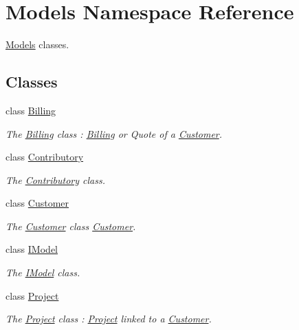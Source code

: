 \hypertarget{namespaceModels}{\section{Models Namespace Reference}
\label{namespaceModels}
}


\hyperlink{namespaceModels}{Models} classes.  


\subsection*{Classes}
\begin{DoxyCompactItemize}
\item 
class \hyperlink{classModels_1_1Billing}{Billing}
\begin{DoxyCompactList}\small\item\em The \hyperlink{classModels_1_1Billing}{Billing} class \-: \hyperlink{classModels_1_1Billing}{Billing} or Quote of a \hyperlink{classModels_1_1Customer}{Customer}. \end{DoxyCompactList}\item 
class \hyperlink{classModels_1_1Contributory}{Contributory}
\begin{DoxyCompactList}\small\item\em The \hyperlink{classModels_1_1Contributory}{Contributory} class. \end{DoxyCompactList}\item 
class \hyperlink{classModels_1_1Customer}{Customer}
\begin{DoxyCompactList}\small\item\em The \hyperlink{classModels_1_1Customer}{Customer} class \hyperlink{classModels_1_1Customer}{Customer}. \end{DoxyCompactList}\item 
class \hyperlink{classModels_1_1IModel}{I\-Model}
\begin{DoxyCompactList}\small\item\em The \hyperlink{classModels_1_1IModel}{I\-Model} class. \end{DoxyCompactList}\item 
class \hyperlink{classModels_1_1Project}{Project}
\begin{DoxyCompactList}\small\item\em The \hyperlink{classModels_1_1Project}{Project} class \-: \hyperlink{classModels_1_1Project}{Project} linked to a \hyperlink{classModels_1_1Customer}{Customer}. \end{DoxyCompactList}\item 

\end{DoxyCompactItemize}
